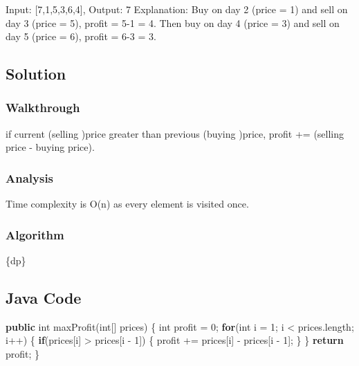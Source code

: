 \documentclass[]{book}
\newenvironment{Shaded}{\begin{snugshade}}{\end{snugshade}}
\newcommand{\DataTypeTok}[1]{\textcolor[rgb]{0.13,0.29,0.53}{#1}}
\newcommand{\DecValTok}[1]{\textcolor[rgb]{0.00,0.00,0.81}{#1}}
\newcommand{\FunctionTok}[1]{\textcolor[rgb]{0.00,0.00,0.00}{#1}}
\newcommand{\KeywordTok}[1]{\textcolor[rgb]{0.13,0.29,0.53}{\textbf{#1}}}
\newcommand{\NormalTok}[1]{#1}
\begin{document}
Input: {[}7,1,5,3,6,4{]}, Output: 7
Explanation: Buy on day 2 (price = 1) and sell on day 3 (price = 5), profit = 5-1 = 4.
Then buy on day 4 (price = 3) and sell on day 5 (price = 6), profit = 6-3 = 3.

\hypertarget{solution-27}{%
\subsection{Solution}\label{solution-27}}

\hypertarget{walkthrough-33}{%
\subsubsection{Walkthrough}\label{walkthrough-33}}

if current (selling )price greater than previous (buying )price, profit += (selling price - buying price).

\hypertarget{analysis-36}{%
\subsubsection{Analysis}\label{analysis-36}}

Time complexity is O(n) as every element is visited once.

\hypertarget{algorithm-36}{%
\subsubsection{Algorithm}\label{algorithm-36}}

\{dp\}

\hypertarget{java-code-30}{%
\subsection{Java Code}\label{java-code-30}}

\begin{Shaded}
\begin{Highlighting}[]
\KeywordTok{public} \DataTypeTok{int} \FunctionTok{maxProfit}\NormalTok{(}\DataTypeTok{int}\NormalTok{[] prices) \{}
    \DataTypeTok{int}\NormalTok{ profit = }\DecValTok{0}\NormalTok{;}
    \KeywordTok{for}\NormalTok{(}\DataTypeTok{int}\NormalTok{ i = }\DecValTok{1}\NormalTok{; i < prices.}\FunctionTok{length}\NormalTok{; i++) \{}
        \KeywordTok{if}\NormalTok{(prices[i] > prices[i - }\DecValTok{1}\NormalTok{]) \{}
\NormalTok{            profit += prices[i] - prices[i - }\DecValTok{1}\NormalTok{];}
\NormalTok{        \}}
\NormalTok{    \}}
    \KeywordTok{return}\NormalTok{ profit;}
\NormalTok{\}}
\end{Highlighting}
\end{Shaded}
\end{document}
